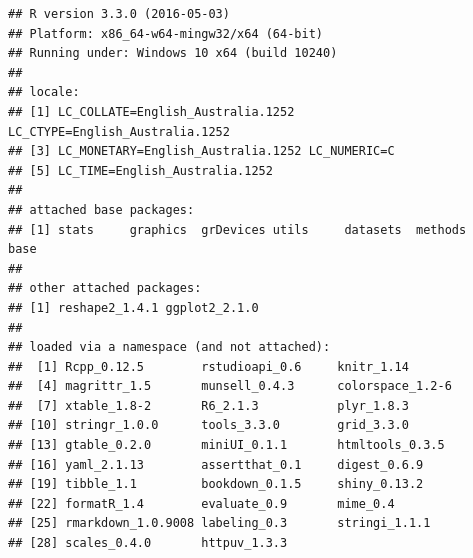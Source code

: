 \documentclass[a4paper]{book}
\begin{document}
\begin{verbatim}
## R version 3.3.0 (2016-05-03)
## Platform: x86_64-w64-mingw32/x64 (64-bit)
## Running under: Windows 10 x64 (build 10240)
## 
## locale:
## [1] LC_COLLATE=English_Australia.1252  LC_CTYPE=English_Australia.1252   
## [3] LC_MONETARY=English_Australia.1252 LC_NUMERIC=C                      
## [5] LC_TIME=English_Australia.1252    
## 
## attached base packages:
## [1] stats     graphics  grDevices utils     datasets  methods   base     
## 
## other attached packages:
## [1] reshape2_1.4.1 ggplot2_2.1.0 
## 
## loaded via a namespace (and not attached):
##  [1] Rcpp_0.12.5        rstudioapi_0.6     knitr_1.14        
##  [4] magrittr_1.5       munsell_0.4.3      colorspace_1.2-6  
##  [7] xtable_1.8-2       R6_2.1.3           plyr_1.8.3        
## [10] stringr_1.0.0      tools_3.3.0        grid_3.3.0        
## [13] gtable_0.2.0       miniUI_0.1.1       htmltools_0.3.5   
## [16] yaml_2.1.13        assertthat_0.1     digest_0.6.9      
## [19] tibble_1.1         bookdown_0.1.5     shiny_0.13.2      
## [22] formatR_1.4        evaluate_0.9       mime_0.4          
## [25] rmarkdown_1.0.9008 labeling_0.3       stringi_1.1.1     
## [28] scales_0.4.0       httpuv_1.3.3
\end{verbatim}
\end{document}
